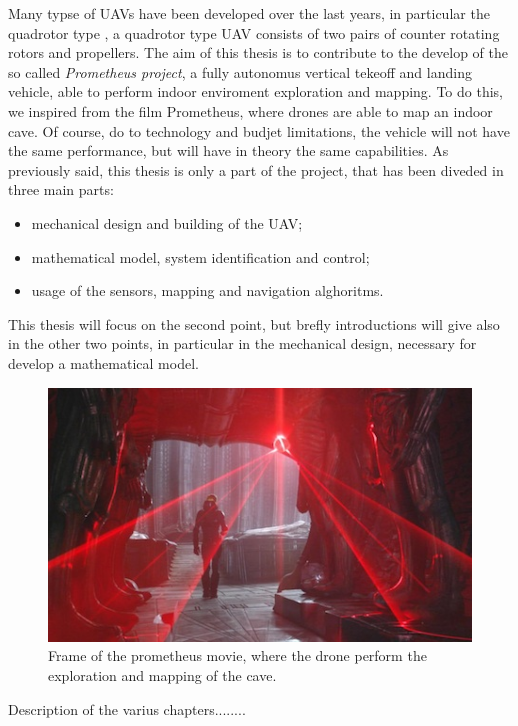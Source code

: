 \documentclass[11pt, a4paper, onecolumn, fleqn, twoside, titlepage, openright]{book}
\begin{document}
	\noindent Many typse of UAVs have been developed over the last years, in particular the quadrotor type \cite{LeeController}, a quadrotor type UAV consists of two pairs of counter rotating rotors and propellers. The aim of this thesis is to contribute to the develop of the so called \textit{Prometheus project}, a fully autonomus vertical tekeoff and landing vehicle, able to perform indoor enviroment exploration and mapping. To do this, we inspired from the film Prometheus, where drones are able to map an indoor cave. Of course, do to technology and budjet limitations, the vehicle will not have the same performance, but will have in theory the same capabilities. As previously said, this thesis is only a part of the project, that has been diveded in three main parts:

	\begin{itemize}
		\item mechanical design and building of the UAV;
		\item mathematical model, system identification and control;
		\item usage of the sensors, mapping and navigation alghoritms.
	\end{itemize}

	\noindent This thesis will focus on the second point, but brefly introductions will give also in the other two points, in particular in the mechanical design, necessary for develop a mathematical model. 

	\begin{figure}
		\includegraphics[scale=0.6]{images/prometheus_film.jpg}
		\caption{Frame of the prometheus movie, where the drone perform the exploration and mapping of the cave.}
		\label{fig:prometheusFILM}
	\end{figure}

	\noindent Description of the varius chapters........
\end{document}
